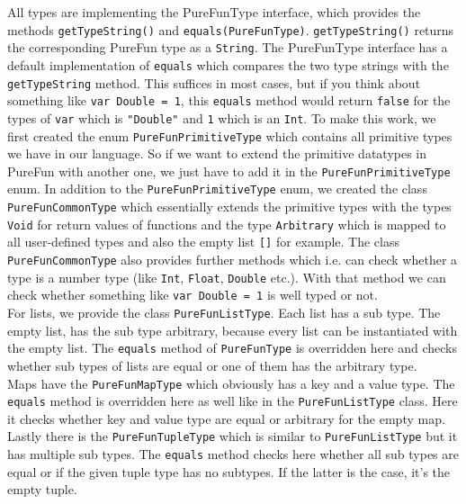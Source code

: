 All types are implementing the PureFunType interface, which provides the methods \lstinline{getTypeString()}{} and \lstinline{equals(PureFunType)}{}. \lstinline{getTypeString()}{} returns the corresponding PureFun type as a \lstinline{String}{}. The PureFunType interface has a default implementation of \lstinline{equals}{} which compares the two type strings with the \lstinline{getTypeString}{} method. This suffices in most cases, but if you think about something like \lstinline{var Double = 1}{}, this \lstinline{equals}{} method would return \lstinline{false}{} for the types of \lstinline{var}{} which is \lstinline{"Double"}{} and \lstinline{1}{} which is an \lstinline{Int}{}. To make this work, we first created the enum \lstinline{PureFunPrimitiveType}{} which contains all primitive types we have in our language. So if we want to extend the primitive datatypes in PureFun with another one, we just have to add it in the \lstinline{PureFunPrimitiveType}{} enum. In addition to the \lstinline{PureFunPrimitiveType}{} enum, we created the class \lstinline{PureFunCommonType}{} which essentially extends the primitive types with the types \lstinline{Void}{} for return values of functions and the type \lstinline{Arbitrary}{} which is mapped to all user-defined types and also the empty list \lstinline{[]}{} for example. The class \lstinline{PureFunCommonType}{} also provides further methods which i.e. can check whether a type is a number type (like \lstinline{Int}{}, \lstinline{Float}{}, \lstinline{Double}{} etc.). With that method we can check whether something like \lstinline{var Double = 1}{} is well typed or not.\\
For lists, we provide the class \lstinline{PureFunListType}{}. Each list has a sub type. The empty list, has the sub type arbitrary, because every list can be instantiated with the empty list. The \lstinline{equals}{} method of \lstinline{PureFunType}{} is overridden here and checks whether sub types of lists are equal or one of them has the arbitrary type.\\
Maps have the \lstinline{PureFunMapType}{} which obviously has a key and a value type. The \lstinline{equals}{} method is overridden here as well like in the \lstinline{PureFunListType}{} class. Here it checks whether key and value type are equal or arbitrary for the empty map.\\
Lastly there is the \lstinline{PureFunTupleType}{} which is similar to \lstinline{PureFunListType}{} but it has multiple sub types. The \lstinline{equals}{} method checks here whether all sub types are equal or if the given tuple type has no subtypes. If the latter is the case, it's the empty tuple.\\
